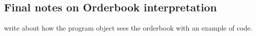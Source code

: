 
\newpage
\subsection{Final notes on Orderbook interpretation}

write about how the program object sees the orderbook with an example of code. 




\newpage